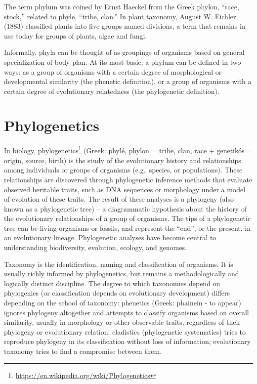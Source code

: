 \documentclass[]{book}
\let\rmarkdownfootnote\footnote%
\def\footnote{\protect\rmarkdownfootnote}
\renewcommand{\href}[2]{#2\footnote{\url{#1}}}
\theoremstyle{definition}
\theoremstyle{definition}
\theoremstyle{definition}
\theoremstyle{remark}
\begin{document}
The term phylum was coined by Ernst Haeckel from the Greek phylon,
``race, stock,'' related to phyle, ``tribe, clan.'' In plant taxonomy,
August W. Eichler (1883) classified plants into five groups named
divisions, a term that remains in use today for groups of plants, algae
and fungi.

Informally, phyla can be thought of as groupings of organisms based on
general specialization of body plan. At its most basic, a phylum can be
defined in two ways: as a group of organisms with a certain degree of
morphological or developmental similarity (the phenetic definition), or
a group of organisms with a certain degree of evolutionary relatedness
(the phylogenetic definition).

\section{Phylogenetics}\label{phylogenetics}

In biology,
\href{https://en.wikipedia.org/wiki/Phylogenetics}{phylogenetics}
(Greek: phylé, phylon = tribe, clan, race + genetikós = origin, source,
birth) is the study of the evolutionary history and relationships among
individuals or groups of organisms (e.g.~species, or populations). These
relationships are discovered through phylogenetic inference methods that
evaluate observed heritable traits, such as DNA sequences or morphology
under a model of evolution of these traits. The result of these analyses
is a phylogeny (also known as a phylogenetic tree) -- a diagrammatic
hypothesis about the history of the evolutionary relationships of a
group of organisms. The tips of a phylogenetic tree can be living
organisms or fossils, and represent the ``end'', or the present, in an
evolutionary lineage. Phylogenetic analyses have become central to
understanding biodiversity, evolution, ecology, and genomes.

Taxonomy is the identification, naming and classification of organisms.
It is usually richly informed by phylogenetics, but remains a
methodologically and logically distinct discipline. The degree to which
taxonomies depend on phylogenies (or classification depends on
evolutionary development) differs depending on the school of taxonomy:
phenetics (Greek: phainein - to appear) ignores phylogeny altogether and
attempts to classify organisms based on overall similarity, usually in
morphology or other observable traits, regardless of their phylogeny or
evolutionary relation; cladistics (phylogenetic systematics) tries to
reproduce phylogeny in its classification without loss of information;
evolutionary taxonomy tries to find a compromise between them.  
\end{document}
